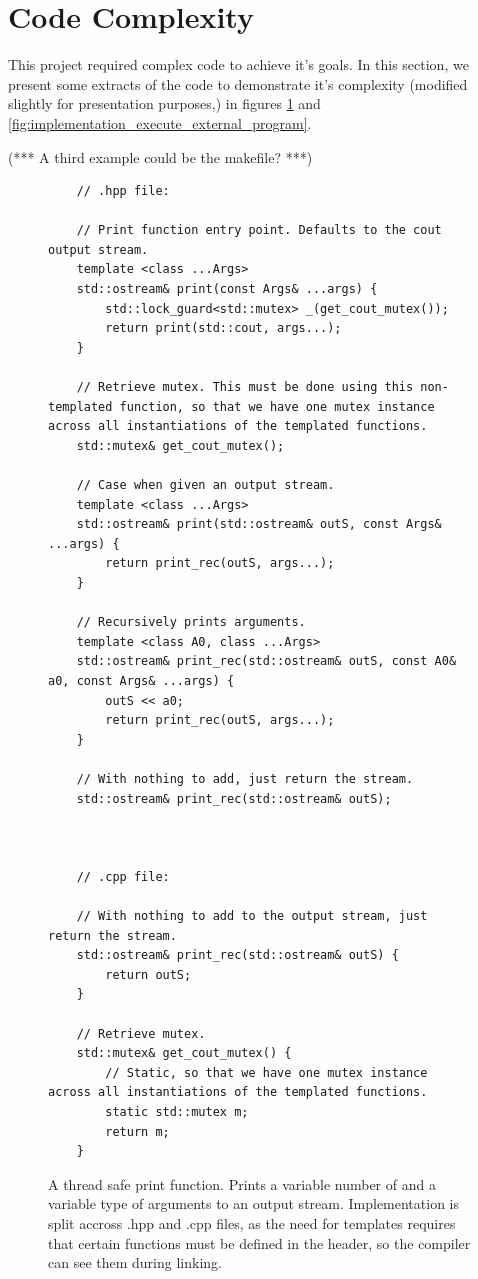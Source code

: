 \section{Code Complexity}

This project required complex code to achieve it's goals. In this section, we present some extracts of the code to demonstrate it's complexity (modified slightly for presentation purposes,) in figures \ref{fig:implementation_thread_safe_print} and \ref{fig:implementation_execute_external_program}.

(*** A third example could be the makefile? ***)

\begin{figure}
	\begin{lstlisting}
	// .hpp file:

	// Print function entry point. Defaults to the cout output stream.
	template <class ...Args>
	std::ostream& print(const Args& ...args) {
	    std::lock_guard<std::mutex> _(get_cout_mutex());
	    return print(std::cout, args...);
	}

	// Retrieve mutex. This must be done using this non-templated function, so that we have one mutex instance across all instantiations of the templated functions.
	std::mutex& get_cout_mutex();

	// Case when given an output stream.
	template <class ...Args>
	std::ostream& print(std::ostream& outS, const Args& ...args) {
	    return print_rec(outS, args...);
	}

	// Recursively prints arguments.
	template <class A0, class ...Args>
	std::ostream& print_rec(std::ostream& outS, const A0& a0, const Args& ...args) {
	    outS << a0;
	    return print_rec(outS, args...);
	}

	// With nothing to add, just return the stream. 
	std::ostream& print_rec(std::ostream& outS);



	// .cpp file:

	// With nothing to add to the output stream, just return the stream.
	std::ostream& print_rec(std::ostream& outS) {
	    return outS;
	}

	// Retrieve mutex.
	std::mutex& get_cout_mutex() {
		// Static, so that we have one mutex instance across all instantiations of the templated functions.
	    static std::mutex m;
	    return m;
	}
	\end{lstlisting}

	\caption{A thread safe print function. Prints a variable number of and a variable type of arguments to an output stream. Implementation is split accross .hpp and .cpp files, as the need for templates requires that certain functions must be defined in the header, so the compiler can see them during linking.}
	\label{fig:implementation_thread_safe_print}
\end{figure}



